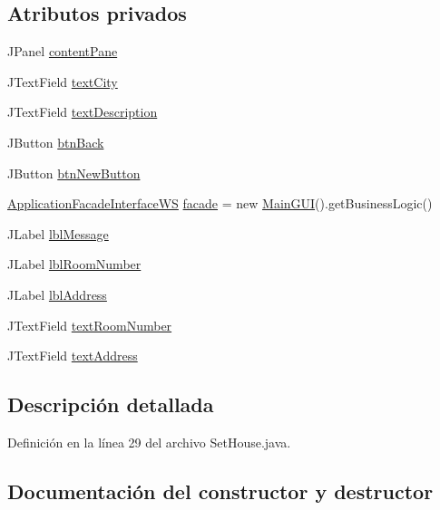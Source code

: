 \subsection*{Atributos privados}
\begin{DoxyCompactItemize}
\item 
J\+Panel \mbox{\hyperlink{classgui_1_1_set_house_a634e8201d87551eed6e180a40699e110}{content\+Pane}}
\item 
J\+Text\+Field \mbox{\hyperlink{classgui_1_1_set_house_ac7f5a3fa4bb474d1ef8949df7c1a1395}{text\+City}}
\item 
J\+Text\+Field \mbox{\hyperlink{classgui_1_1_set_house_a54e03877cc31fe5cbc2513094e7fcc3d}{text\+Description}}
\item 
J\+Button \mbox{\hyperlink{classgui_1_1_set_house_a13f738cdb6c7310f7001d6799d7a6065}{btn\+Back}}
\item 
J\+Button \mbox{\hyperlink{classgui_1_1_set_house_a51e87586b716545419f9b105039baba7}{btn\+New\+Button}}
\item 
\mbox{\hyperlink{interfacebusiness_logic_1_1_application_facade_interface_w_s}{Application\+Facade\+Interface\+WS}} \mbox{\hyperlink{classgui_1_1_set_house_ac2825921a399582ec53017704b5bf65f}{facade}} = new \mbox{\hyperlink{classgui_1_1_main_g_u_i}{Main\+G\+UI}}().get\+Business\+Logic()
\item 
J\+Label \mbox{\hyperlink{classgui_1_1_set_house_a7aed946e97375e1948b4ca8829a2e3a1}{lbl\+Message}}
\item 
J\+Label \mbox{\hyperlink{classgui_1_1_set_house_a56c1015ff2ee4e195c0ab8af428b438e}{lbl\+Room\+Number}}
\item 
J\+Label \mbox{\hyperlink{classgui_1_1_set_house_ad76075de3f61a56b63db0a9c49b7f9a3}{lbl\+Address}}
\item 
J\+Text\+Field \mbox{\hyperlink{classgui_1_1_set_house_a34af222b11f96409a6b8124b9f86ca68}{text\+Room\+Number}}
\item 
J\+Text\+Field \mbox{\hyperlink{classgui_1_1_set_house_aa98697a65302143d8d090c3593fd4f86}{text\+Address}}
\end{DoxyCompactItemize}


\subsection{Descripción detallada}


Definición en la línea 29 del archivo Set\+House.\+java.



\subsection{Documentación del constructor y destructor}
\mbox{\label{classgui_1_1_set_house_aa47531b2839fe7b13dbde7fa421b03d6}} 
